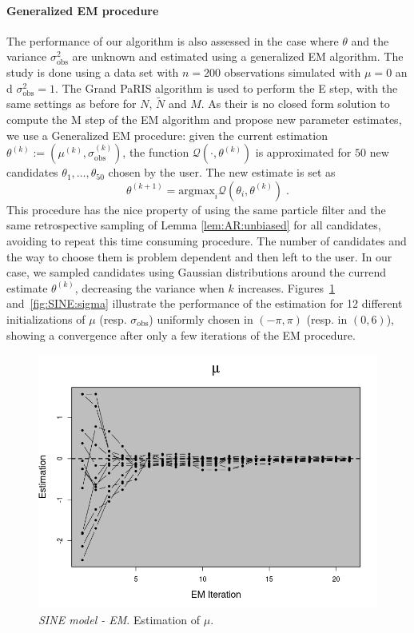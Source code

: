 \documentclass[12pt]{article}
\newcommand{\eqsp}{\;}
\newcommand{\1}{\mathrm{1}}
\begin{document}
\paragraph{Generalized EM procedure}
The performance of our algorithm is also assessed in the case where $\theta$ and the variance $\sigma^2_\text{obs}$ are unknown and estimated using a generalized EM algorithm. 
The study is done using a data set with $n = 200$ observations simulated with $\mu=0$ an d $ \sigma^2_\text{obs} = 1$. The Grand PaRIS algorithm is used to perform the E step, with the same settings as before for $N$, $\tilde{N}$ and $M$.
As their is no closed form solution to compute the M step of the EM algorithm and propose new parameter estimates, we use a Generalized EM procedure: given the current estimation $\theta^{(k)} := \left(\mu^{(k)}, \sigma_{\text{obs}}^{(k)} \right)$, the function $\mathcal{Q}(\cdot, \theta^{(k)})$ is approximated for $50$ new candidates $\theta_1, \dots, \theta_{50} $ chosen by the user. The new estimate is set as
\[
\theta^{(k + 1)} = \text{argmax}_i\mathcal{Q}(\theta_i, \theta^{(k)})\eqsp .
\]
This procedure has the nice property of using the same particle filter and the same retrospective sampling of Lemma \ref{lem:AR:unbiased} for all candidates, avoiding to repeat this time consuming procedure. 
The number of candidates and the way to choose them is problem dependent and then left to the user. 
In our case, we sampled candidates using Gaussian distributions around the currend estimate $\theta^{(k)}$, decreasing the variance when $k$ increases.
Figures~\ref{fig:SINE:theta} and~\ref{fig:SINE:sigma} illustrate the performance of the estimation for 12 different initializations of $\mu$ (resp. $\sigma_\text{obs}$) uniformly chosen in  $(-\pi,\pi)$ (resp. in $(0,6)$), showing a convergence after only a few iterations of the EM procedure.

\begin{figure}[p]
\centering
\includegraphics[scale=0.5]{figure_theta}
\caption{{\em SINE model - EM}. Estimation  of $\mu$.}
\label{fig:SINE:theta}
\end{figure}
\end{document}
